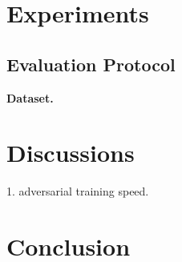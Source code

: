 \documentclass[10pt,twocolumn,letterpaper]{article}
\begin{document}
\section{Experiments}
\label{sec:4}

\subsection{Evaluation Protocol}

\textbf{Dataset.}

\section{Discussions}
\label{sec:5}

1. adversarial training speed.

\section{Conclusion}
\label{sec:6}

\cite{Authors14}

{\small


}


\end{document}
